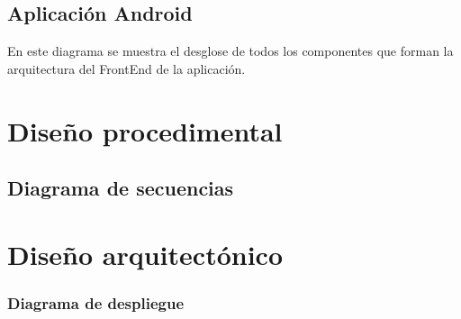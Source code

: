 
\subsection{Aplicación Android}

En este diagrama se muestra el desglose de todos los componentes que forman la arquitectura del FrontEnd de la aplicación.



\section{Diseño procedimental}

\subsection{Diagrama de secuencias}

\section{Diseño arquitectónico}

\subsubsection{Diagrama de despliegue}



